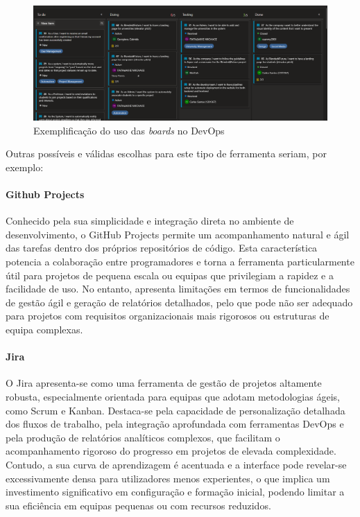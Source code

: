 \begin{figure}[h!tbp]
    \includegraphics[width=\linewidth]{capitulos/cap1-introducao/imagens/ferramentas/devops-board.png}
    \caption{Exemplificação do uso das \textit{boards} no DevOps}
    \label{fig:devops-boards}
\end{figure}

Outras possíveis e válidas escolhas para este tipo de ferramenta seriam, por exemplo:

\paragraph{Github Projects}

Conhecido pela sua simplicidade e integração direta no ambiente de desenvolvimento, o GitHub Projects permite um acompanhamento natural e ágil das tarefas dentro dos próprios repositórios de código. Esta característica potencia a colaboração entre programadores e torna a ferramenta particularmente útil para projetos de pequena escala ou equipas que privilegiam a rapidez e a facilidade de uso. No entanto, apresenta limitações em termos de funcionalidades de gestão ágil e geração de relatórios detalhados, pelo que pode não ser adequado para projetos com requisitos organizacionais mais rigorosos ou estruturas de equipa complexas.

\paragraph{Jira}

O Jira apresenta-se como uma ferramenta de gestão de projetos altamente robusta, especialmente orientada para equipas que adotam metodologias ágeis, como Scrum e Kanban. Destaca-se pela capacidade de personalização detalhada dos fluxos de trabalho, pela integração aprofundada com ferramentas DevOps e pela produção de relatórios analíticos complexos, que facilitam o acompanhamento rigoroso do progresso em projetos de elevada complexidade. Contudo, a sua curva de aprendizagem é acentuada e a interface pode revelar-se excessivamente densa para utilizadores menos experientes, o que implica um investimento significativo em configuração e formação inicial, podendo limitar a sua eficiência em equipas pequenas ou com recursos reduzidos.


